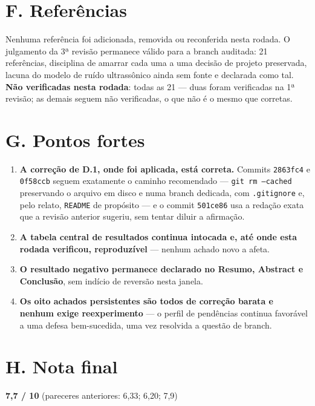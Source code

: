 \documentclass[11pt,a4paper]{article}
\begin{document}
\section*{F. Referências}

Nenhuma referência foi adicionada, removida ou reconferida nesta rodada. O julgamento da 3ª revisão
permanece válido para a branch auditada: 21 referências, disciplina de amarrar cada uma a uma decisão
de projeto preservada, lacuna do modelo de ruído ultrassônico ainda sem fonte e declarada como tal.
\textbf{Não verificadas nesta rodada}: todas as 21 --- duas foram verificadas na 1ª revisão; as
demais seguem não verificadas, o que não é o mesmo que corretas.

\section*{G. Pontos fortes}

\begin{enumerate}
  \item \textbf{A correção de D.1, onde foi aplicada, está correta.} Commits \texttt{2863fc4} e
  \texttt{0f58ccb} seguem exatamente o caminho recomendado --- \texttt{git rm --cached} preservando o
  arquivo em disco e numa branch dedicada, com \texttt{.gitignore} e, pelo relato, \texttt{README} de
  propósito --- e o commit \texttt{501ce86} usa a redação exata que a revisão anterior sugeriu, sem
  tentar diluir a afirmação.
  \item \textbf{A tabela central de resultados continua intocada e, até onde esta rodada verificou,
  reproduzível} --- nenhum achado novo a afeta.
  \item \textbf{O resultado negativo permanece declarado no Resumo, Abstract e Conclusão}, sem
  indício de reversão nesta janela.
  \item \textbf{Os oito achados persistentes são todos de correção barata e nenhum exige
  reexperimento} --- o perfil de pendências continua favorável a uma defesa bem-sucedida, uma vez
  resolvida a questão de branch.
\end{enumerate}

\section*{H. Nota final}

\begin{center}
\Large\textbf{7,7 / 10} \quad\normalsize (pareceres anteriores: 6,33; 6,20; 7,9)
\end{center}
\end{document}
